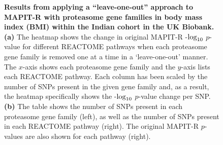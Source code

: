 \documentclass[10pt]{article}
\def\log{{\rm log}}
\begin{document}
\begin{figure}[H]
{\begin{tabular}{|cc|ccc|}
  \hline
\end{tabular}}
\caption{\textbf{Results from applying a ``leave-one-out'' approach to MAPIT-R with proteasome gene families in body mass index (BMI) within the Indian cohort in the UK Biobank.} \textbf{(a)} The heatmap shows the change in original MAPIT-R -$\log_{10}$ $p$-value for different REACTOME pathways when each proteasome gene family is removed one at a time in a `leave-one-out' manner. The $x$-axis shows each proteasome gene family and the $y$-axis lists each REACTOME pathway. Each column has been scaled by the number of SNPs present in the given gene family and, as a result, the heatmap specifically shows the -$\log_{10}$ $p$-value change per SNP. \textbf{(b)} The table shows the number of SNPs present in each proteasome gene family (left), as well as the number of SNPs present in each REACTOME pathway (right). The original MAPIT-R $p$-values are also shown for each pathway (right).}
\label{InterPath-Supp-Figure-Prot-Heatplots-Indian}
\end{figure}
\clearpage

\end{document}
